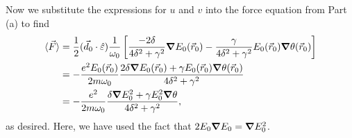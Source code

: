 \documentclass{article}
\theoremstyle{definition}
\newcommand{\f}[2]{\frac{#1}{#2}}
\newcommand{\lb}{\left[}
\newcommand{\rb}{\right]}
\begin{document}
\begin{enumerate}[label=\alph*)]
	Now we substitute the expressions for $u$ and $v$ into the force equation from Part (a) to find 
	\begin{align*}
	\langle \vec{F} \rangle 
	&= \f{1}{2}(\vec{d}_0 \cdot \hat{\varepsilon}) \f{1}{\omega_0} \lb \f{-2\delta}{4\delta^2 + \gamma^2}  \grad E_0(\vec{r}_0) -  \f{\gamma}{ 4 \delta^2 + \gamma^2} E_0(\vec{r}_0) \grad \theta(\vec{r}_0) \rb  \\
	&= -\f{e^2 E_0(\vec{r}_0)}{2 m \omega_0} \f{2\delta \grad E_0(\vec{r}_0) + \gamma E_0(\vec{r}_0) \grad \theta(\vec{r}_0)}{4\delta^2 + \gamma^2} \\
	&= -\f{e^2}{2m\omega_0} \f{\delta \grad E_0^2 + \gamma E_0^2\grad \theta}{4\delta^2 + \gamma^2},
	\end{align*}
	as desired. Here, we have used the fact that $2E_0 \grad E_0 = \grad E_0^2$. 
\end{enumerate}
\end{document}
